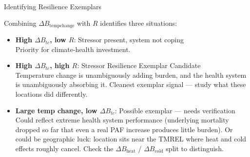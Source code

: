 \documentclass[aspectratio=169,10pt]{beamer}
\begin{document}
\begin{frame}{Identifying Resilience Exemplars}

  Combining $\Delta B_{\text{tempchange}}$ with $R$ identifies three situations:

  \vspace{0.5em}
  \begin{itemize}
    \item \textbf{High $\Delta B_{tc}$, low $R$}: Stressor present, system \alert{not coping}\\
      {\small Priority for climate-health investment.}

    \vspace{0.5em}
    \item \textbf{High $\Delta B_{tc}$, high $R$}: \alert{Stressor Resilience Exemplar Candidate}\\
      {\small Temperature change is unambiguously adding burden, and the health system is unambiguously absorbing it. Cleanest exemplar signal --- study what these locations did differently.}

    \vspace{0.5em}
    \item \textbf{Large temp change, low $\Delta B_{tc}$}: \alert{Possible exemplar} --- needs verification\\
      {\small Could reflect extreme health system performance (underlying mortality dropped so far that even a real PAF increase produces little burden). Or could be geographic luck: location sits near the TMREL where heat and cold effects roughly cancel. Check the $\Delta B_{\text{heat}}$ / $\Delta B_{\text{cold}}$ split to distinguish.}
  \end{itemize}
\end{frame}
\end{document}
